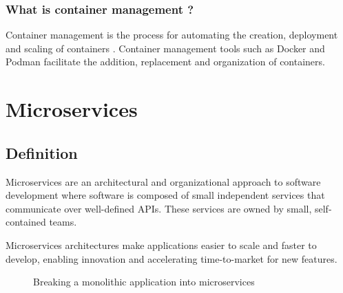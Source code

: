 \subsubsection*{What is container management ?}
Container management is the process for automating the creation, deployment and scaling of containers \cite{container-management}.
Container management tools such as Docker and Podman facilitate the addition, replacement and organization of containers.

\section{Microservices}

\subsection{Definition}
Microservices are an architectural and organizational approach to software development where software is composed of small independent services that communicate over well-defined APIs.
These services are owned by small, self-contained teams. \cite{microservices}

\medskip
Microservices architectures make applications easier to scale and faster to develop, enabling innovation and accelerating time-to-market for new features.
\begin{figure}[H]
    \centering
    \caption{Breaking a monolithic application into microservices}
    \label{fig:monolith-to-microservices}
\end{figure}
